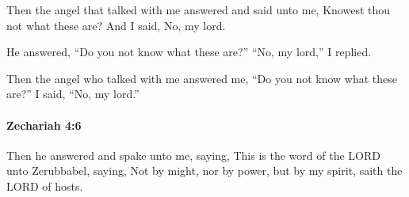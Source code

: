 			\begin{versebox}
					\item[BHS] 
					\item[LXX] 
					\item[ASV] Then the angel that talked with me answered and said unto me, Knowest thou not what these are? And I said, No, my lord.
					\item[NIV] He answered, “Do you not know what these are?” “No, my lord,” I replied.
					\item[NRSV] Then the angel who talked with me answered me, “Do you not know what these are?” I said, “No, my lord.”
			\end{versebox}

		\paragraph{Zechariah 4:6} %
			\label{ZECHARIAH-4-6}

			Then he answered and spake unto me, saying, This is the word of the LORD unto Zerubbabel, saying, Not by might, nor by power, but by my spirit, saith the LORD of hosts.

